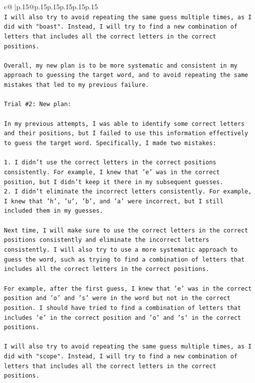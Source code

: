 \documentclass{article}
\begin{document}
{\begin{supertabular}{c@{$\;$}|p{.15\linewidth}@{}p{.15\linewidth}p{.15\linewidth}p{.15\linewidth}p{.15\linewidth}p{.15\linewidth}}
{{{\\ 
\texttt{I will also try to avoid repeating the same guess multiple times, as I did with "boast". Instead, I will try to find a new combination of letters that includes all the correct letters in the correct positions. } \\
\\ 
\texttt{Overall, my new plan is to be more systematic and consistent in my approach to guessing the target word, and to avoid repeating the same mistakes that led to my previous failure.} \\
\\ 
\texttt{Trial \#2: New plan: } \\
\\ 
\texttt{In my previous attempts, I was able to identify some correct letters and their positions, but I failed to use this information effectively to guess the target word. Specifically, I made two mistakes: } \\
\\ 
\texttt{1. I didn't use the correct letters in the correct positions consistently. For example, I knew that 'e' was in the correct position, but I didn't keep it there in my subsequent guesses. } \\
\texttt{2. I didn't eliminate the incorrect letters consistently. For example, I knew that 'h', 'u', 'b', and 'a' were incorrect, but I still included them in my guesses.} \\
\\ 
\texttt{Next time, I will make sure to use the correct letters in the correct positions consistently and eliminate the incorrect letters consistently. I will also try to use a more systematic approach to guess the word, such as trying to find a combination of letters that includes all the correct letters in the correct positions. } \\
\\ 
\texttt{For example, after the first guess, I knew that 'e' was in the correct position and 'o' and 's' were in the word but not in the correct position. I should have tried to find a combination of letters that includes 'e' in the correct position and 'o' and 's' in the correct positions. } \\
\\ 
\texttt{I will also try to avoid repeating the same guess multiple times, as I did with "scope". Instead, I will try to find a new combination of letters that includes all the correct letters in the correct positions. } \\
}}}
\end{supertabular}}
\end{document}
